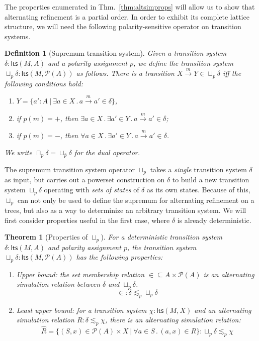 \documentclass[11pt]{article}
\newcommand{\kw}[1]{{\mathsf{#1}}}
\newtheorem{definition}{Definition}
\newtheorem{theorem}{Theorem}
\begin{document}
The properties enumerated in Thm.~\ref{thm:altsimprops}
will allow us to show that alternating refinement
is a partial order.
In order to exhibit its complete lattice structure,
we will need the following polarity-sensitive operator
on transition systems.

\begin{definition}[Supremum transition system]
Given a transition system $\delta : \kw{lts}(M, A)$
and a polarity assignment $p$,
we define the transition system
$\sqcup_p \delta : \kw{lts}(M, \mathcal{P}(A))$
as follows.
There is a transition $X \stackrel{m}{\rightarrow} Y \in \sqcup_p \delta$
iff the following conditions hold:
\begin{enumerate}
\item $Y = \{ a' : A \:|\: \exists a \in X \,.\,
  a \stackrel{m}{\rightarrow} a' \in \delta \}$,
\item if $p(m) = +$, then $\exists a \in X \,.\, \exists a' \in Y \,.\,
  a \stackrel{m}{\rightarrow} a' \in \delta$;
\item if $p(m) = -$, then $\forall a \in X \,.\, \exists a' \in Y \,.\,
  a \stackrel{m}{\rightarrow} a' \in \delta$.
\end{enumerate}
We write $\sqcap_p \delta = \sqcup_{\bar{p}} \delta$ for the dual operator.
\end{definition}

The supremum transition system operator $\sqcup_p$
takes a \emph{single} transition system $\delta$ as input,
but carries out a powerset construction on $\delta$
to build a new transition system $\sqcup_p \delta$
operating with \emph{sets of states} of $\delta$
as its own states.
Because of this, $\sqcup_p$ can not only be used
to define the supremum for alternating refinement on a trees,
but also as a way to determinize an arbitrary transition system.
We will first consider properties useful in the first case,
where $\delta$ is already deterministic.

\begin{theorem}[Properties of $\sqcup_p$]
\label{thm:supprops}
For a deterministic transition system $\delta : \kw{lts}(M, A)$
and polarity assignment $p$,
the transition system $\sqcup_p \delta : \kw{lts}(M, \mathcal{P}(A))$
has the following properties:
\begin{enumerate}
\item Upper bound: the set membership relation
  ${\in} \subseteq A \times \mathcal{P}(A)$ is
  an alternating simulation relation between $\delta$ and $\sqcup_p \delta$.
  \[ {\in} : \delta \lesssim_p {\sqcup_p \delta} \]
\item Least upper bound:
  for a transition system $\chi : \kw{lts}(M, X)$
  and an alternating simulation relation $R : \delta \lesssim_p \chi$,
  there is an alternating simulation relation:
  \[ 
     \hat{R} = \{ (S, x) \in \mathcal{P}(A) \times X \:|\:
                  \forall a \in S \,.\, (a, x) \in R \}
       : \sqcup_p \delta \lesssim_p \chi
  \]
\end{enumerate}
\end{theorem}
\end{document}
